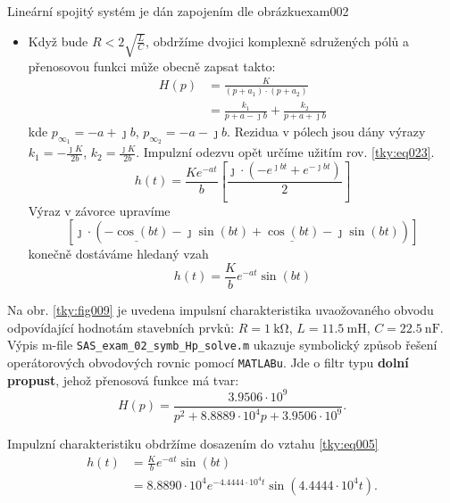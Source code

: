 \begin{tkyexam}{Lineární spojitý systém je dán zapojením dle obrázku}{exam002}
\begin{itemize}[leftmargin=12pt,noitemsep]
\begin{align*}
          \end{align*}
    \item Když bude $R<2\sqrt{\frac{L}{C}}$, obdržíme dvojici komplexně sdružených pólů a
          přenosovou funkci může obecně zapsat takto:
          \begin{align*}
            H(p)&=\frac{K}{(p+a_1)\cdot(p+a_2)}            \\
                &=\frac{k_1}{p+a-\jmath b}+\frac{k_2}{p+a+\jmath b}
          \end{align*}
          kde $p_{\infty_1}=-a+\jmath b$, $p_{\infty_2}=-a-\jmath b$. Rezidua v pólech jsou dány
          výrazy $k_1=-\frac{\jmath K}{2b}$, $k_2=\frac{\jmath K}{2b}$. Impulzní odezvu opět
          určíme užitím rov. \ref{tky:eq023}.
          \begin{equation*}
            h(t) = \frac{Ke^{-at}}{b}
                    \left[\dfrac{\jmath\cdot\left(-e^{\jmath bt}+e^{-\jmath bt}\right)}{2}\right]
          \end{equation*}
          Výraz v závorce upravíme
          \begin{equation*}
            \left[\jmath\cdot\left(\underline{-\cos(bt)}-\jmath\sin(bt) + 
                                    \underline{\cos(bt)} -\jmath\sin(bt)
                              \right)
            \right]                                                     
          \end{equation*}
          konečně dostáváme hledaný vzah
          \begin{equation*}              
            h(t) = \frac{K}{b}e^{-at}\sin(bt)                                   
          \end{equation*}
  \end{itemize}
  
  Na obr. \ref{tky:fig009} je uvedena impulsní charakteristika uvaožovaného obvodu odpovídající
  hodnotám stavebních prvků: \(R=\SI{1}{\kohm}\), \(L=\SI{11.5}{\milli\henry}\),
  \(C=\SI{22.5}{\nano\farad}\). Výpis m-file \texttt{SAS\_exam\_02\_symb\_Hp\_solve.m} ukazuje
  symbolický způsob řešení operátorových obvodových rovnic pomocí \texttt{MATLABu}. Jde o filtr typu
  \textbf{dolní propust}, jehož přenosová funkce má tvar:
  $$H(p)= \frac{3.9506\cdot10^9}{p^2+8.8889\cdot10^4p+3.9506\cdot10^9}.$$

  Impulzní charakteristiku obdržíme dosazením do vztahu \ref{tky:eq005}
  \begin{align*}
    h(t)&=\frac{K}{b}e^{-at}\sin(bt)                                      \\
        &=8.8890\cdot10^4e^{-4.4444\cdot10^4t}\sin(4.4444\cdot10^4t).
  \end{align*}
      

\end{tkyexam}
